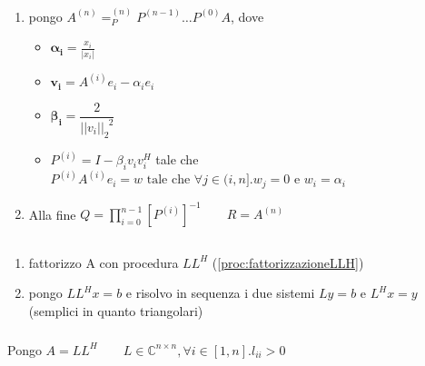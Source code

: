 \askip


\askip


\askip

\begin{proc}[Fattorizzazione QR]\label{proc:fattorizzazioneQR}
\begin{enumerate}
	\item pongo $ A^{(n)} = _P^{(n)} P^{(n-1)} \ldots P^{(0)}A $, dove
	\begin{itemize}
		\item $ \bm{\alpha_i} = \frac{x_i}{|x_i|} $
		\item $ \bm{v_i} = A^{(i)}e_i - \alpha_i e_i $
		\item $ \bm{\beta_i} = \dfrac{2}{|| v_i ||_2^{\phantom{2}2}} $
		\item $ P^{(i)} = I - \beta_i v_i v_i^H $ tale che $ P^{(i)}A^{(i)}e_i = w \text{ tale che } \forall j \in (i,n]. w_j = 0 \text{ e } w_i = \alpha_i $
	\end{itemize}
	\item Alla fine $ Q = \prod_{i = 0}^{n-1} \left[ P^{(i)} \right]^{-1} \qquad R = A^{(n)} $
\end{enumerate}
\end{proc}




\subsection{}



\begin{proc}
\begin{enumerate}
\item fattorizzo A con procedura $ LL^H $ (\ref{proc:fattorizzazioneLLH})
\item pongo $ LL^Hx = b $ e risolvo in sequenza i due sistemi $ Ly = b $ e $ L^Hx = y $ (semplici in quanto triangolari)
\end{enumerate}
\end{proc}


\subsubsection{}
Pongo $ A = LL^H \qquad L \in \mathbb{C}^{n \times n}, \forall i \in [1,n].l_{ii} > 0 $

